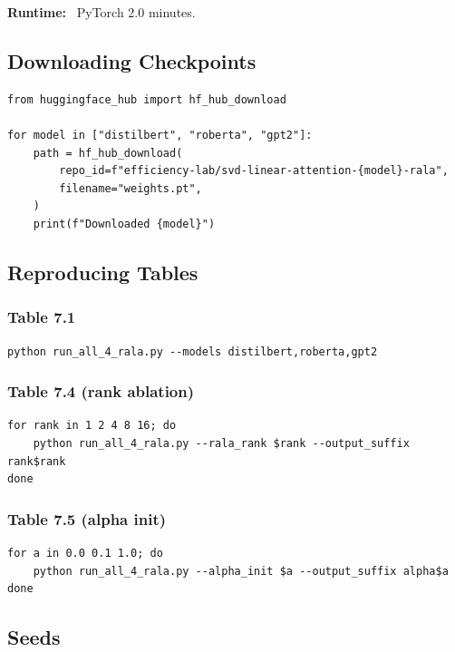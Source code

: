 \textbf{Runtime:} ~PyTorch 2.0 minutes.

\subsection{Downloading Checkpoints}

\begin{lstlisting}
from huggingface_hub import hf_hub_download

for model in ["distilbert", "roberta", "gpt2"]:
    path = hf_hub_download(
        repo_id=f"efficiency-lab/svd-linear-attention-{model}-rala",
        filename="weights.pt",
    )
    print(f"Downloaded {model}")
\end{lstlisting}

\subsection{Reproducing Tables}

\subsubsection{Table 7.1}

\begin{lstlisting}
python run_all_4_rala.py --models distilbert,roberta,gpt2
\end{lstlisting}

\subsubsection{Table 7.4 (rank ablation)}

\begin{lstlisting}
for rank in 1 2 4 8 16; do
    python run_all_4_rala.py --rala_rank $rank --output_suffix rank$rank
done
\end{lstlisting}

\subsubsection{Table 7.5 (alpha init)}

\begin{lstlisting}
for a in 0.0 0.1 1.0; do
    python run_all_4_rala.py --alpha_init $a --output_suffix alpha$a
done
\end{lstlisting}

\subsection{Seeds}

